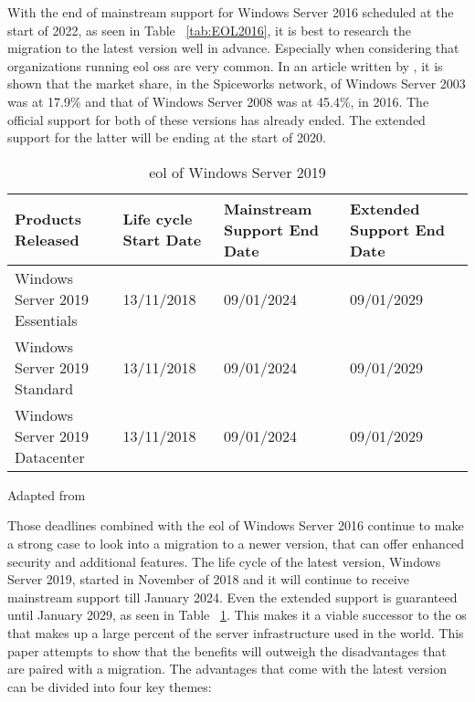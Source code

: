 With the end of mainstream support for Windows Server 2016 scheduled at the start of 2022, as seen in Table ~\ref{tab:EOL2016}, it is best to research the migration to the latest version well in advance. Especially when considering that organizations running \acrfull{eol} \acrshort{os}s are very common. In an article written by \textcite{Tsai2016}, it is shown that the market share, in the Spiceworks network, of Windows Server 2003 was at 17.9\% and that of Windows Server 2008 was at 45.4\%, in 2016. The official support for both of these versions has already ended. The extended support for the latter will be ending at the start of 2020. 

\begin{table}[ht]
	\centering
	\begin{adjustbox}{width=1\textwidth}
		\begin{tabular}{l|l|l|ll}
			Products Released & Life cycle Start Date & Mainstream Support End Date & Extended Support End Date &\\
			\hline
			Windows Server 2019 Essentials & 13/11/2018 & 09/01/2024 & 09/01/2029 &\\
			Windows Server 2019 Standard & 13/11/2018 & 09/01/2024 & 09/01/2029 &\\
			Windows Server 2019 Datacenter & 13/11/2018 & 09/01/2024 & 09/01/2029 &\\
		\end{tabular}
	\end{adjustbox}
	\caption[\acrshort{eol} \acrshort{ws}2019]{\acrshort{eol} of Windows Server 2019}
	\scriptsize	
	Adapted from \cite{MicrosoftEOL2019}
	\label{tab:EOL2019}
\end{table}

Those deadlines combined with the \acrshort{eol} of Windows Server 2016 continue to make a strong case to look into a migration to a newer version, that can offer enhanced security and additional features. The life cycle of the latest version, Windows Server 2019, started in November of 2018 and it will continue to receive mainstream support till January 2024. Even the extended support is guaranteed until January 2029, as seen in Table ~\ref{tab:EOL2019}. This makes it a viable successor to the \acrshort{os} that makes up a large percent of the server infrastructure used in the world. This paper attempts to show that the benefits will outweigh the disadvantages that are paired with a migration. The advantages that come with the latest version can be divided into four key themes:

